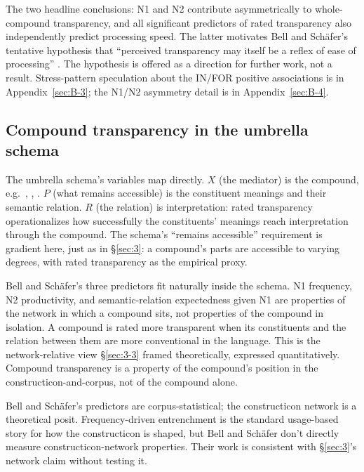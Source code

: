 The two headline conclusions: \textup{N1} and \textup{N2} contribute asymmetrically to whole-compound transparency, and all significant predictors of rated transparency also independently predict processing speed. The latter motivates Bell and Schäfer's tentative hypothesis that \enquote{perceived transparency may itself be a reflex of ease of processing} \autocite[157]{bell-schafer-2016-modelling-transparency}. The hypothesis is offered as a direction for further work, not a result. Stress-pattern speculation about the IN/FOR positive associations is in Appendix~\ref{sec:B-3}; the \textup{N1}/\textup{N2} asymmetry detail is in Appendix~\ref{sec:B-4}.

\subsection{Compound transparency in the umbrella schema}

The umbrella schema's variables map directly. $X$ (the mediator) is the compound, e.g.~, , . $P$ (what remains accessible) is the constituent meanings and their semantic relation. $R$ (the relation) is interpretation: rated transparency operationalizes how successfully the constituents' meanings reach interpretation through the compound. The schema's \enquote{remains accessible} requirement is gradient here, just as in §\ref{sec:3}: a compound's parts are accessible to varying degrees, with rated transparency as the empirical proxy.

Bell and Schäfer's three predictors fit naturally inside the schema. \textup{N1} frequency, \textup{N2} productivity, and semantic-relation expectedness given \textup{N1} are properties of the network in which a compound sits, not properties of the compound in isolation. A compound is rated more transparent when its constituents and the relation between them are more conventional in the language. This is the network-relative view §\ref{sec:3-3} framed theoretically, expressed quantitatively. Compound transparency is a property of the compound's position in the constructicon-and-corpus, not of the compound alone.

Bell and Schäfer's predictors are corpus-statistical; the constructicon network is a theoretical posit. Frequency-driven entrenchment is the standard usage-based story for how the constructicon is shaped, but Bell and Schäfer don't directly measure constructicon-network properties. Their work is consistent with §\ref{sec:3}'s network claim without testing it.

